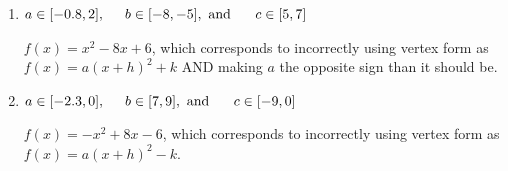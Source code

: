 \documentclass{extbook}[14pt]
\begin{document}
\begin{enumerate}
{\begin{enumerate}[label=\Alph*.]
$f(x)=x^{2} +8 x + 6$, which corresponds to making $a$ the opposite sign than it should be.
\item \( a \in [-0.8, 2], \hspace*{5mm} b \in [-8, -5], \text{ and } \hspace*{5mm} c \in [5, 7] \)

$f(x)=x^{2} -8 x + 6$, which corresponds to incorrectly using vertex form as $f(x) = a(x+h)^2+k$ AND making $a$ the opposite sign than it should be.
\item \( a \in [-2.3, 0], \hspace*{5mm} b \in [7, 9], \text{ and } \hspace*{5mm} c \in [-9, 0] \)

$f(x)=-x^{2} +8 x -6$, which corresponds to incorrectly using vertex form as $f(x) = a(x+h)^2 - k$.
\end{enumerate}

}
\end{enumerate}
\end{document}
